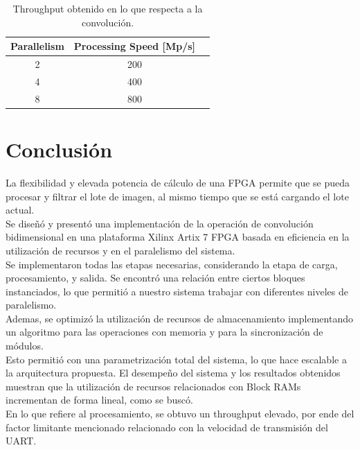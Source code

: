 \documentclass[a4paper]{article}
\begin{document}
\begin{table}[H]
\renewcommand{\arraystretch}{1.3}
\caption{Throughput obtenido en lo que respecta a la convolución.}
\label{conv_tp}
\centering
\begin{tabular}{|c|c|c|}
 \hline
  \textbf{Parallelism}  &    \textbf{Processing Speed [Mp/s]}  \\ \hline
          2             &                     200              \\ \hline
          4             &                     400              \\ \hline
          8             &                     800              \\ \hline
\end{tabular}           
\end{table}


\section{Conclusión}  \label{conclusion_sec}

La flexibilidad y elevada potencia de cálculo de una FPGA permite que se pueda
procesar y filtrar el lote de imagen, al mismo tiempo que se está cargando el lote
actual. \\

Se diseñó y presentó una implementación de la operación de convolución bidimensional en una
plataforma Xilinx Artix 7 FPGA basada en eficiencia en la utilización de recursos y en el paralelismo del sistema.\\
Se implementaron todas las etapas necesarias, considerando la etapa de carga, procesamiento, y salida. Se
encontró una relación entre ciertos bloques instanciados, lo que permitió a nuestro sistema trabajar con diferentes
niveles de paralelismo.\\

Ademas, se optimizó la utilización de recursos de almacenamiento implementando un algoritmo para las
operaciones con memoria y para la sincronización de módulos.\\
Esto permitió con una parametrización total del sistema, lo que hace escalable a la arquitectura propuesta.
El desempeño del sistema y los resultados obtenidos muestran que la utilización de recursos relacionados con
Block RAMs incrementan de forma lineal, como se buscó.\\

En lo que refiere al procesamiento, se obtuvo un throughput elevado, por ende del factor limitante mencionado relacionado 
con la velocidad de transmisión del UART.
\end{document}
